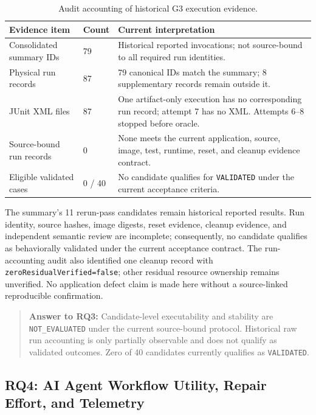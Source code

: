 \documentclass[pdflatex,sn-mathphys-num]{sn-jnl}
\begin{document}
\begin{table}[t]
\caption{Audit accounting of historical G3 execution evidence.}\label{tab:g3-audit-accounting}
\centering
\small
\begin{tabular}{lp{2.5cm}p{9cm}}
\toprule
\textbf{Evidence item} & \textbf{Count} & \textbf{Current interpretation} \\
\midrule
Consolidated summary IDs & 79 & Historical reported invocations; not source-bound to all required run identities. \\
Physical run records & 87 & 79 canonical IDs match the summary; 8 supplementary records remain outside it. \\
JUnit XML files & 87 & One artifact-only execution has no corresponding run record; attempt 7 has no XML. Attempts 6–8 stopped before oracle. \\
Source-bound run records & 0 & None meets the current application, source, image, test, runtime, reset, and cleanup evidence contract. \\
Eligible validated cases & 0 / 40 & No candidate qualifies for \texttt{VALIDATED} under the current acceptance criteria. \\
\bottomrule
\end{tabular}
\end{table}

The summary's 11 rerun-pass candidates remain historical reported results. Run identity, source hashes, image digests, reset evidence, cleanup evidence, and independent semantic review are incomplete; consequently, no candidate qualifies as behaviorally validated under the current acceptance contract. The run-accounting audit also identified one cleanup record with \texttt{zeroResidualVerified=false}; other residual resource ownership remains unverified. No application defect claim is made here without a source-linked reproducible confirmation.

\begin{quote}
\textbf{Answer to RQ3:} Candidate-level executability and stability are \texttt{NOT\_EVALUATED} under the current source-bound protocol. Historical raw run accounting is only partially observable and does not qualify as validated outcomes. Zero of 40 candidates currently qualifies as \texttt{VALIDATED}.
\end{quote}

\subsection{RQ4: AI Agent Workflow Utility, Repair Effort, and Telemetry}
\end{document}
